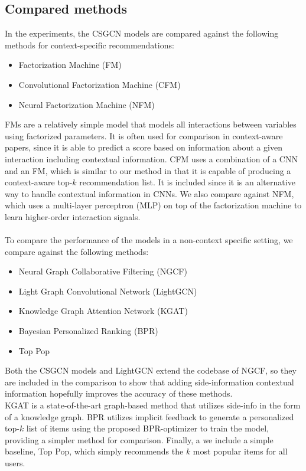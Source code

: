 \subsection{Compared methods}
In the experiments, the CSGCN models are compared against the following methods for context-specific recommendations:
\begin{itemize}
    \item Factorization Machine (FM) \cite{fmrendle}
    \item Convolutional Factorization Machine (CFM) \cite{CFM}
    \item Neural Factorization Machine (NFM) \cite{NeuralFM}
\end{itemize}
FMs are a relatively simple model that models all interactions between variables using factorized parameters.
It is often used for comparison in context-aware papers, since it is able to predict a score based on information about a given interaction including contextual information.
CFM uses a combination of a CNN and an FM, which is similar to our method in that it is capable of producing a context-aware top-$k$ recommendation list.
It is included since it is an alternative way to handle contextual information in CNNs.
We also compare against NFM, which uses a multi-layer perceptron (MLP) on top of the factorization machine to learn higher-order interaction signals.
\\\\
To compare the performance of the models in a non-context specific setting, we compare against the following methods:
\begin{itemize}
    \item Neural Graph Collaborative Filtering (NGCF) \cite{NGCF}
    \item Light Graph Convolutional Network (LightGCN) \cite{LightGCN}
    \item Knowledge Graph Attention Network (KGAT) \cite{KGAT}
    \item Bayesian Personalized Ranking (BPR) \cite{BPR}
    \item Top Pop
\end{itemize}
Both the CSGCN models and LightGCN extend the codebase of NGCF, so they are included in the comparison to show that adding side-information contextual information hopefully improves the accuracy of these methods.\\
KGAT is a state-of-the-art graph-based method that utilizes side-info in the form of a knowledge graph.
BPR utilizes implicit feedback to generate a personalized top-$k$ list of items using the proposed BPR-optimizer to train the model, providing a simpler method for comparison.
Finally, a we include a simple baseline, Top Pop, which simply recommends the $k$ most popular items for all users.

